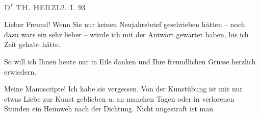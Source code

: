 \pstart
           \textcolor{gray}{\textbf{D\textsuperscript{r}{ }TH. HERZL}}\hfill 2. I. 93\pend
           
\pstart{}Lieber Freund!\pend\vspace{0.5em}
\pstart
           Wenn Sie nur keinen Neujahrsbrief geschrieben hätten – noch dazu wars ein sehr lieber
               – würde ich mit der Antwort gewartet haben, bis ich Zeit gehabt hätte.\pend
           
\pstart
           So will ich Ihnen heute nur in Eile danken und Ihre freundlichen Grüsse herzlich
               erwiedern.\pend
           
\pstart
           Meine Manuscripte! Ich habe sie vergessen. Von der Kunstübung ist mir nur etwas Liebe
               zur Kunst geblieben u. an manchen Tagen oder in verlorenen Stunden ein Heimweh nach
               der Dichtung. Nicht ungestraft ist {\pb}man
